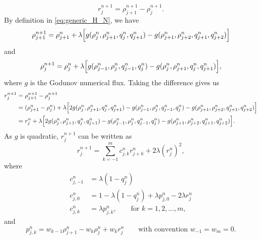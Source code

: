 \[
    r_j^{n+1} =  \rho_{j+1}^{n+1} - \rho_j^{n+1}.
\]
By definition in \eqref{eq:generic_H_N}, we have
\[
    \rho_{j+1}^{n+1} = \rho_{j+1}^{n} + \lambda\Bigl[ g(\rho_{j}^{n}, \rho_{j+1}^{n}, q_{j}^{n},q_{j+1}^{n})-g(\rho_{j+1}^{n}, \rho_{j+2}^{n}, q_{j+1}^{n},q_{j+2}^{n})\Bigr]
\]
and
\[
    \rho_{j}^{n+1} = \rho_{j}^{n} + \lambda\Bigl[ g(\rho_{j-1}^{n}, \rho_{j}^{n}, q_{j-1}^{n},q_{j}^{n})-g(\rho_{j}^{n}, \rho_{j+1}^{n}, q_{j}^{n},q_{j+1}^{n})\Bigr],
\]
where $g$ is the Godunov numerical flux.
Taking the difference gives us
\begin{equation*}
    \begin{split}
        r_j^{n+1} & = \rho_{j+1}^{n+1} - \rho_j^{n+1}                                                                                                                                                                                            \\
                  & = (\rho_{j+1}^n - \rho_j^n) + \lambda\Bigl[ 2g(\rho_{j}^{n}, \rho_{j+1}^{n}, q_{j}^{n},q_{j+1}^{n})-g(\rho_{j-1}^{n}, \rho_{j}^{n}, q_{j-1}^{n},q_{j}^{n})- g(\rho_{j+1}^{n}, \rho_{j+2}^{n}, q_{j+1}^{n},q_{j+2}^{n})\Bigr] \\
                  & =  r_j^n +  \lambda\Bigl[ 2g(\rho_{j}^{n}, \rho_{j+1}^{n}, q_{j}^{n},q_{j+1}^{n})-g(\rho_{j-1}^{n}, \rho_{j}^{n}, q_{j-1}^{n},q_{j}^{n})- g(\rho_{j+1}^{n}, \rho_{j+2}^{n}, q_{j+1}^{n},q_{j+2}^{n})\Bigr].
    \end{split}
\end{equation*}
As $g$ is quadratic, $r_j^{n+1}$ can be written as
\begin{equation}\label{eq:differences_God}
    r_j^{n+1}
    =
    \sum_{k=-1}^m c_{j,k}^n r_{j+k}^n
    +2\lambda(r_j^n)^2,
\end{equation}
where
\begin{align*}
    c_{j,-1}^n & = \lambda(1-q_j^n)                                           \\
    c_{j,0}^n  & = 1 - \lambda (1- q_j^n) + \lambda p_{j,0}^n -2\lambda r_j^n \\
    c_{j,k}^n  & = \lambda p_{j,k}^n, \qquad \text{for } k= 1,2,\dots,m,
\end{align*}
and
\[ p_{j,k}^n =  w_{k-1}\rho_{j+1}^n - w_k\rho_j^n + w_k r_j^n \qquad \text{with convention } w_{-1}= w_m = 0.\]

